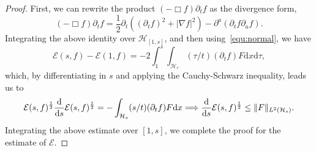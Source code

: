 \documentclass[a4paper,reqno]{amsart}
\theoremstyle{definition}
\numberwithin{equation}{section}
\def \pt{\partial_{t}}
\begin{document}
     \begin{proof}
         First, we can rewrite the product $(-\Box f)\pt f$ as the divergence form,
         \begin{equation*}
             (-\Box f)\partial_{t}f=\frac{1}{2}\pt \left((\pt f)^{2}+|\nabla f|^{2}\right)-\partial^{a}\left(\partial_{t}f\partial_{a}f\right).
         \end{equation*}
         Integrating the above identity over $\mathcal{H}_{[1,s]}$, and then using~\eqref{equ:normal}, we have 
         \begin{equation*}
             \mathcal{E}(s,f)-\mathcal{E}(1,f)=-2\int_{1}^{s}\int_{\mathcal{H}_{\tau}}(\tau/t)(\pt f)F\mathrm{d}x\mathrm{d}\tau,
         \end{equation*}
         which, by differentiating in $s$ and applying the Cauchy-Schwarz inequality, leads us to
          \begin{equation*}
             \mathcal{E}(s,f)^{1\over 2} {\mathrm{d}\over \mathrm{d}s}\mathcal{E}(s,f)^{1\over 2}=-\int_{\mathcal{H}_{s}}(s/t)(\pt f)F\mathrm{d}x\Longrightarrow {
             {\mathrm{d}\over \mathrm{d}s}}\mathcal{E}(s,f)^{1\over 2}
             \leq \|F\|_{L^{2}{(\mathcal{H}_{s})}}.
         \end{equation*}  
         Integrating the above estimate over $[1,s]$, we complete the proof for the estimate of $\mathcal{E}$.


\end{proof}
\end{document}
